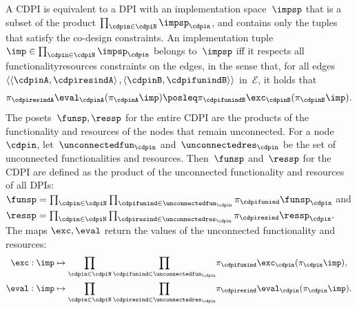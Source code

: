 A CDPI is equivalent to a DPI with an implementation space~$\impsp$
that is a subset of the product $\prod_{\cdpin\in\cdpiN}\impsp_{\cdpin}$,
and contains only the tuples that satisfy the co-design constraints.
An implementation tuple~$\imp\in\prod_{\cdpin\in\cdpiN}\impsp_{\cdpin}$
belongs to~$\impsp$ iff it respects all functionality\textendash resources
constraints on the edges, in the sense that, for all edges~$\left\langle \left\langle \cdpinA,\cdpiresindA\right\rangle ,\left\langle \cdpinB,\cdpifunindB\right\rangle \right\rangle $
in~$\mathcal{E}$, it holds that 
\[
\pi_{\cdpiresindA}\eval_{\cdpinA}(\pi_{\cdpinA}\imp)\posleq\pi_{\cdpifunindB}\exc_{\cdpinB}(\pi_{\cdpinB}\imp).
\]
The posets~$\funsp,\ressp$ for the entire CDPI are the products
of the functionality and resources of the nodes that remain unconnected.
For a node~$\cdpin$, let~$\unconnectedfun_{\cdpin}$ and~$\unconnectedres_{\cdpin}$
be the set of unconnected functionalities and resources. Then~$\funsp$
and~$\ressp$ for the CDPI are defined as the product of the unconnected
functionality and resources of all DPIs: $\funsp=\prod_{\cdpin\in\cdpiN}\prod_{\cdpifunind\in\unconnectedfun_{\cdpin}}\pi_{\cdpifunind}\funsp_{\cdpin}$
and $\ressp=\prod_{\cdpin\in\cdpiN}\prod_{\cdpiresind\in\unconnectedres_{\cdpin}}\pi_{\cdpiresind}\ressp_{\cdpin}.$
The maps $\exc,\eval$ return the values of the unconnected functionality
and resources:
\begin{align*}
\exc:\imp & \mapsto{\scriptstyle {\displaystyle \prod_{\cdpin\in\cdpiN}\prod_{\cdpifunind\in\unconnectedfun_{\cdpin}}}}\pi_{\cdpifunind}\exc_{\cdpin}(\pi_{\cdpin}\imp),\\
\eval:\imp & \mapsto{\displaystyle \prod_{\cdpin\in\cdpiN}\prod_{\cdpiresind\in\unconnectedres_{\cdpin}}}\pi_{\cdpiresind}\eval_{\cdpin}(\pi_{\cdpin}\imp).
\end{align*}

